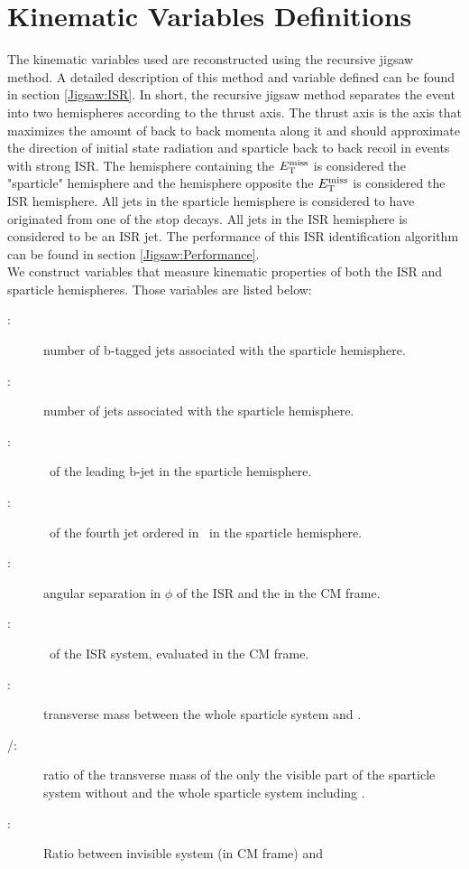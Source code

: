 \section{Kinematic Variables Definitions}
\label{sec:SR:Definitions}

The kinematic variables used are reconstructed using the recursive jigsaw method.  A detailed description of this method and variable defined can be found in section \ref{Jigsaw:ISR}.  In short, the recursive jigsaw method separates the event into two hemispheres according to the thrust axis.  The thrust axis is the axis that maximizes the amount of back to back momenta along it and should approximate the direction of initial state radiation and sparticle back to back recoil in events with strong ISR.  The hemisphere containing the $E_{\mathrm{T}}^{\mathrm{miss}}$ is considered the "sparticle" hemisphere and the hemisphere opposite the $E_{\mathrm{T}}^{\mathrm{miss}}$ is considered the ISR hemisphere.  All jets in the sparticle hemisphere is considered to have originated from one of the stop decays.  All jets in the ISR hemisphere is considered to be an ISR jet.  The performance of this ISR identification algorithm can be found in section \ref{Jigsaw:Performance}. \\
We construct variables that measure kinematic properties of both the ISR and sparticle hemispheres.  Those variables are listed below: \\

\begin{description}
\item [\boldmath \nBJetS:] number of b-tagged jets associated with the sparticle hemisphere.
\item [\boldmath \nJetS:] number of jets associated with the sparticle hemisphere.
\item [\boldmath \pTSBZero:] \pt\ of the leading b-jet in the sparticle hemisphere.
\item [\boldmath \pTSFour:] \pt\ of the fourth jet ordered in \pt\ in the sparticle hemisphere.
\item [\boldmath \dPhiISRMET:] angular separation in $\phi$ of the ISR and the \met in the CM frame.
\item [\boldmath \pTISR:] \pt\ of the ISR system, evaluated in the CM frame.
\item [\boldmath \mS:] transverse mass between the whole sparticle system and \met.
\item [\boldmath \mV/\mS:] ratio of the transverse mass of the only the visible part of the sparticle system without \met and the whole sparticle system including \met.
\item [\boldmath \rISR:] Ratio between invisible system (\met in CM frame) and \pTISR
\end{description}

